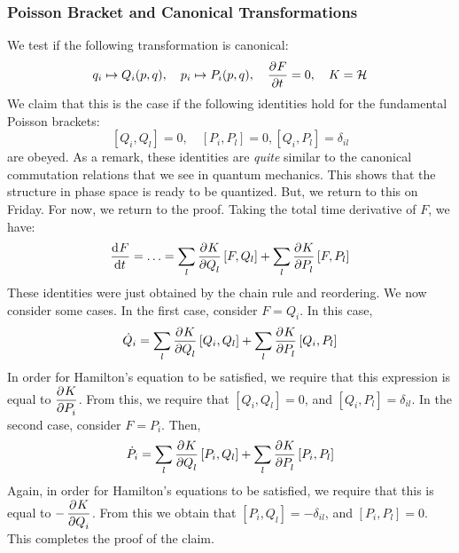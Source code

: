 \subsubsection{Poisson Bracket and Canonical Transformations}
We test if the following transformation is canonical:
\[q_i \mapsto Q_i(p, q), \quad p_i \mapsto P_i(p, q), \quad \dpd{F}{t} = 0, \quad K = \HH\]
We claim that this is the case if the following identities hold for the fundamental Poisson brackets:
\[[Q_i, Q_l] = 0, \quad [P_i, P_l] = 0, [Q_i, P_l] = \delta_{il}\]
are obeyed. As a remark, these identities are \textit{quite} similar to the canonical commutation relations that we see in quantum mechanics. This shows that the structure in phase space is ready to be quantized. But, we return to this on Friday. For now, we return to the proof. Taking the total time derivative of $F$, we have:
\[\dod{F}{t} = \ldots = \sum_l \dpd{K}{Q_l}[F, Q_l] + \sum_l \dpd{K}{P_l}[F, P_l]\]
These identities were just obtained by the chain rule and reordering. We now consider some cases. In the first case, consider $F = Q_i$. In this case,
\[\dot{Q}_i = \sum_l\dpd{K}{Q_l}[Q_i, Q_l] + \sum_l\dpd{K}{P_l}[Q_i, P_l]\]
In order for Hamilton's equation to be satisfied, we require that this expression is equal to $\dpd{K}{P_i}$. From this, we require that $[Q_i, Q_l] = 0$, and $[Q_i, P_l] = \delta_{il}$. In the second case, consider $F =P_i$. Then,
\[\dot{P}_i = \sum_l\dpd{K}{Q_l}[P_i, Q_l] + \sum_l\dpd{K}{P_l}[P_i, P_l]\]
Again, in order for Hamilton's equations to be satisfied, we require that this is equal to $-\dpd{K}{Q_i}$. From this we obtain that $[P_i, Q_l] = -\delta_{il}$, and $[P_i, P_l] = 0$. This completes the proof of the claim. 

